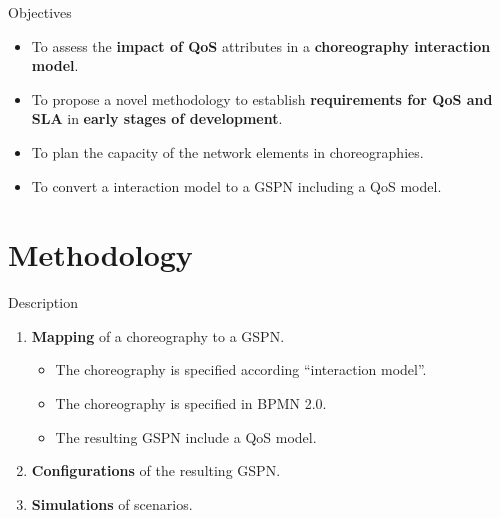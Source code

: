 \documentclass[xcolor=svgnames]{beamer}
\begin{document}
    \begin{frame}
        \begin{block}{Objectives }\vspace{-.3\baselineskip}
        	\begin{itemize}
                  \item To assess the \textbf{impact of QoS} attributes in a \textbf{choreography interaction model}.
		  \item To propose a novel methodology to establish \textbf{requirements for QoS and SLA} in \textbf{early stages of development}.
		  \item To plan the capacity of the network elements in choreographies.
		  \item To convert a interaction model to a GSPN including a QoS model.
            \end{itemize}
        \end{block}
    \end{frame}

\section{Methodology}
  \begin{frame}{Description}
    \begin{enumerate}
      \item <1-> \textbf{Mapping} of a choreography to a GSPN.
	  \begin{itemize}
	    \item The choreography is specified according ``interaction model''.
	    \item The choreography is specified in BPMN 2.0.
	    \item The resulting GSPN include a QoS model.
	  \end{itemize}

      \item <2-> \textbf{Configurations} of the resulting GSPN.
      \item <3-> \textbf{Simulations} of scenarios.
    \end{enumerate}

  \end{frame}
\end{document}
